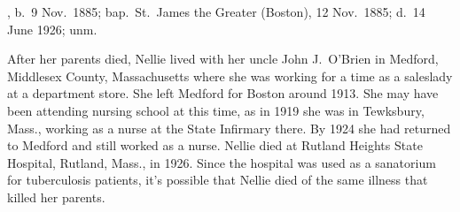 \begin{Kids}
	, b.\ 9 Nov.\ 1885;\cite{Ellen4OBrienBirth} bap.\ St.\ James the Greater (Boston), 12 Nov.\ 1885;\cite{Ellen4OBrienBaptism} d.\ 14 June 1926;\cite{Ellen4OBrienDeath} unm.
	
	\begin{KidsMoreText}
		After her parents died, Nellie lived with her uncle John J.\ O'Brien in Medford, Middlesex County, Massachusetts\cite{Census1900EllenOBrien} where she was working for a time as a saleslady at a department store.\cite{Census1910EllenOBrien} She left Medford for Boston around 1913.\cite{Ellen4OBrien1914} She may have been attending nursing school at this time, as in 1919 she was in Tewksbury, Mass., working as a nurse at the State Infirmary there.\cite{Ellen4OBrien1919,Census1920EllenOBrien} By 1924 she had returned to Medford and still worked as a nurse.\cite{Ellen4OBrien1924} Nellie died at Rutland Heights State Hospital, Rutland, Mass., in 1926.\cite{Ellen4OBrienDeath} Since the hospital was used as a sanatorium for tuberculosis patients,\cite{RutlandHospital} it's possible that Nellie died of the same illness that killed her parents.\cite{Ellen4OBrienDeath}
	\end{KidsMoreText}

\end{Kids}